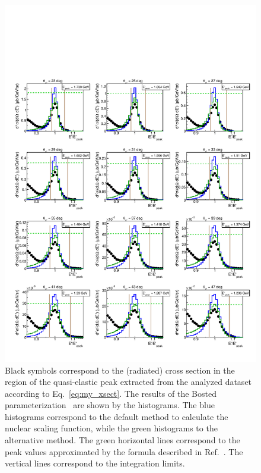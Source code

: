 \begin{figure}[htp]
\begin{center}
\includegraphics[width=\textwidth]{pictures/normalization/my_xsect_pdf.pdf}
\caption{\small Black symbols correspond to the (radiated) cross section in the region of the quasi-elastic peak extracted from the analyzed dataset according to Eq.~\eqref{eq:my_xsect}. The results of the Bosted parameterization~\cite{Bosted_fit,Bosted:2007xd} are shown by the histograms. The blue histograms correspond to the default method to calculate the nuclear scaling function, while the green histograms to the alternative method. The green horizontal lines correspond to the peak values approximated by the formula described in Ref.~\cite{note_QE_peak}. The vertical lines correspond to the integration limits. } \label{fig:my_QE}
\end{center}
\end{figure}

